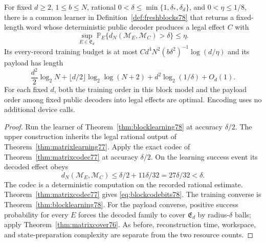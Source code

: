 \begin{corollary}
\label{cor:blocklearnedcode78}
For fixed $d\ge2$, $1\le b\le N$, rational
$0<\delta\le\min\{1,\delta_*,\delta_d\}$, and
$0<\eta\le1/8$, there is a common learner in
Definition~\ref{def:freshblocks78} that returns a fixed-length word
whose deterministic public decoder produces a legal effect $C$ with
\[
 \sup_{E\in\mathfrak E_d}
 \mathbb P_E\{d_N(\mathcal M_E,\mathcal M_C)>\delta\}\le\eta.
\]
Its every-record training budget is at most
$Cd^4N^2(b\delta^2)^{-1}\log(d/\eta)$ and its payload has length
\begin{equation}\label{eq:blockcodebits78}
 \frac{d^2}{2}\log_2N+
 \lfloor d/2\rfloor\log_2\log(N+2)+
 d^2\log_2(1/\delta)+O_d(1).
\end{equation}
For each fixed $d$, both the training order in this block model and
the payload order among fixed public decoders into legal effects are
optimal.  Encoding uses no additional device calls.
\end{corollary}
\begin{proof}
Run the learner of Theorem~\ref{thm:blocklearning78} at accuracy
$\delta/2$.  The upper construction inherits the legal rational
output of Theorem~\ref{thm:matrixlearning77}.  Apply the exact
codec of Theorem~\ref{thm:matrixcodec77} at accuracy $\delta/2$.
On the learning success event its decoded effect obeys
\[
 d_N(\mathcal M_E,\mathcal M_C)
 \le\delta/2+11\delta/32=27\delta/32<\delta.
\]
The codec is a deterministic computation on the recorded rational
estimate.  Theorem~\ref{thm:matrixcodec77} gives
\eqref{eq:blockcodebits78}.  The training converse is
Theorem~\ref{thm:blocklearning78}.  For the payload converse,
positive success probability for every $E$ forces the decoded
family to cover $\mathfrak E_d$ by radius-$\delta$ balls; apply
Theorem~\ref{thm:matrixcover76}.  As before, reconstruction time,
workspace, and state-preparation complexity are separate from the
two resource counts.
\end{proof}
